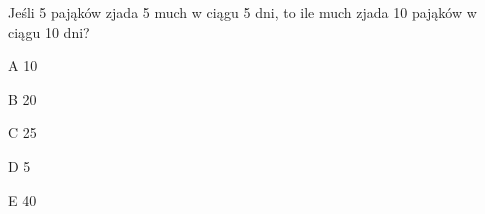 \begin{tresc}
Jeśli 5 pająków zjada 5 much w ciągu 5 dni, to ile much zjada 10 pająków w ciągu 10 dni?
\end{tresc}
\begin{wariant}{A} 10 \end{wariant}
\begin{wariant}{B} 20 \end{wariant}
\begin{wariant}{C} 25 \end{wariant}
\begin{wariant}{D} 5 \end{wariant}
\begin{wariant}{E} 40 \end{wariant}
